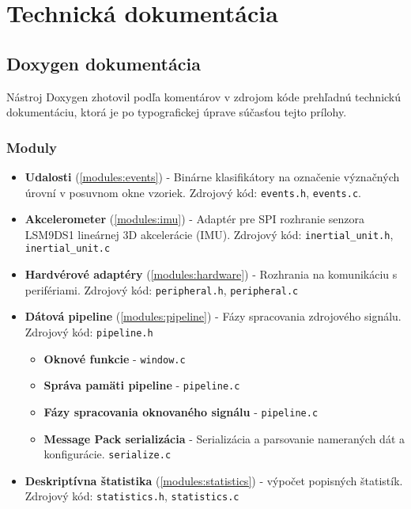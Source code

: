 \thispagestyle{empty}
\chapter{Technická dokumentácia}
\renewcommand*{\thepage}{B-\arabic{page}}

\section{Doxygen dokumentácia}
Nástroj Doxygen zhotovil podľa komentárov v zdrojom kóde prehľadnú technickú dokumentáciu,
ktorá je po typografickej úprave súčasťou tejto prílohy.

\subsection{Moduly}
\begin{itemize}[noitemsep, topsep=0pt]
	\item \textbf{Udalosti} (\ref{modules:events}) - Binárne klasifikátory na označenie význačných úrovní v posuvnom okne vzoriek. 
	Zdrojový kód: \verb|events.h|, \verb|events.c|.
	\item \textbf{Akcelerometer} (\ref{modules:imu}) - Adaptér pre SPI rozhranie senzora LSM9DS1 lineárnej 3D akcelerácie (IMU).
	Zdrojový kód: \verb|inertial_unit.h|, \verb|inertial_unit.c|
	\item \textbf{Hardvérové adaptéry} (\ref{modules:hardware}) - Rozhrania na komunikáciu s perifériami.
	Zdrojový kód: \verb|peripheral.h|, \verb|peripheral.c|
	\item \textbf{Dátová pipeline} (\ref{modules:pipeline}) - Fázy spracovania zdrojového signálu. Zdrojový kód: \verb|pipeline.h|
	\begin{itemize}[noitemsep, topsep=0pt]
		\item \textbf{Oknové funkcie} - \verb|window.c|
		\item \textbf{Správa pamäti pipeline} - \verb|pipeline.c|
		\item \textbf{Fázy spracovania oknovaného signálu} - \verb|pipeline.c|
		\item \textbf{Message Pack serializácia} - Serializácia a parsovanie nameraných dát a konfigurácie. \verb|serialize.c|
	\end{itemize}
	\item \textbf{Deskriptívna štatistika} (\ref{modules:statistics}) - výpočet popisných štatistík. Zdrojový kód: \verb|statistics.h|, \verb|statistics.c|
\end{itemize}


